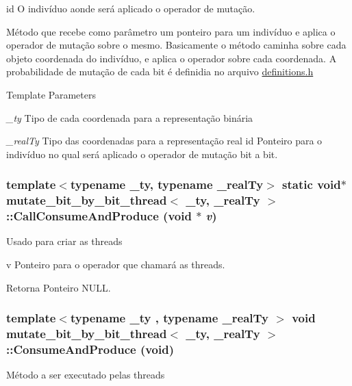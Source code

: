 id O indivíduo aonde será aplicado o operador de mutação.

Método que recebe como parâmetro um ponteiro para um indivíduo e aplica o operador de mutação sobre o mesmo. Basicamente o método caminha sobre cada objeto coordenada do indivíduo, e aplica o operador sobre cada coordenada. A probabilidade de mutação de cada bit é definidia no arquivo \hyperlink{definitions_8h}{definitions.h}


\begin{DoxyTemplParams}{Template Parameters}
\item[{\em \_\-ty}]Tipo de cada coordenada para a representação binária \item[{\em \_\-realTy}]Tipo das coordenadas para a representação real  id Ponteiro para o indivíduo no qual será aplicado o operador de mutação bit a bit. \end{DoxyTemplParams}
\hypertarget{classmutate__bit__by__bit__thread_a6f3893ebf8126e17b2f45e694811765f}{
\subsubsection[{CallConsumeAndProduce}]{\setlength{\rightskip}{0pt plus 5cm}template$<$typename \_\-ty, typename \_\-realTy$>$ static void$\ast$ {\bf mutate\_\-bit\_\-by\_\-bit\_\-thread}$<$ \_\-ty, \_\-realTy $>$::CallConsumeAndProduce (void $\ast$ {\em v})}}
\label{classmutate__bit__by__bit__thread_a6f3893ebf8126e17b2f45e694811765f}
Usado para criar as threads

v Ponteiro para o operador que chamará as threads.

\begin{DoxyReturn}{Retorna}
Ponteiro NULL. 
\end{DoxyReturn}
\hypertarget{classmutate__bit__by__bit__thread_a13d804deae7d91aa75897068eb733050}{
\subsubsection[{ConsumeAndProduce}]{\setlength{\rightskip}{0pt plus 5cm}template$<$typename \_\-ty , typename \_\-realTy $>$ void {\bf mutate\_\-bit\_\-by\_\-bit\_\-thread}$<$ \_\-ty, \_\-realTy $>$::ConsumeAndProduce (void)}}
\label{classmutate__bit__by__bit__thread_a13d804deae7d91aa75897068eb733050}
Método a ser executado pelas threads

